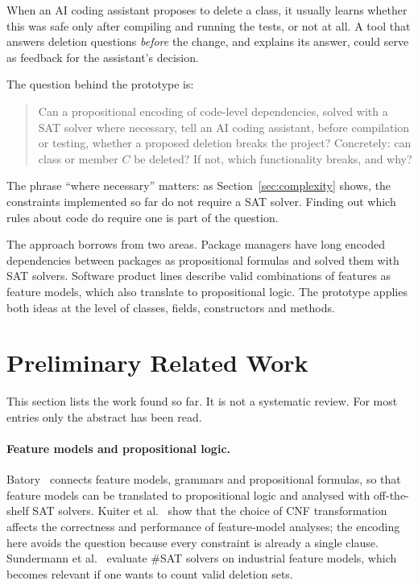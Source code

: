 \documentclass[11pt,a4paper]{article}
\begin{document}
When an AI coding assistant proposes to delete a class, it usually learns
whether this was safe only after compiling and running the tests, or not
at all. A tool that answers deletion questions \emph{before} the change,
and explains its answer, could serve as feedback for the assistant's
decision.

The question behind the prototype is:

\begin{quote}
Can a propositional encoding of code-level dependencies, solved with a
SAT solver where necessary, tell an AI coding assistant, before
compilation or testing, whether a proposed deletion breaks the project?
Concretely: can class or member $C$ be deleted? If not, which
functionality breaks, and why?
\end{quote}

The phrase ``where necessary'' matters: as Section~\ref{sec:complexity}
shows, the constraints implemented so far do not require a SAT solver.
Finding out which rules about code do require one is part of the
question.

The approach borrows from two areas. Package managers have long encoded
dependencies between packages as propositional formulas and solved them
with SAT solvers. Software product lines describe valid combinations of
features as feature models, which also translate to propositional logic.
The prototype applies both ideas at the level of classes, fields,
constructors and methods.

\section{Preliminary Related Work}\label{sec:related}

This section lists the work found so far. It is not a systematic review.
For most entries only the abstract has been read.

\paragraph{Feature models and propositional logic.}
Batory~\cite{batory2005} connects feature models, grammars and
propositional formulas, so that feature models can be translated to
propositional logic and analysed with off-the-shelf SAT solvers. Kuiter et
al.~\cite{kuiter2022} show that the choice of CNF transformation affects
the correctness and performance of feature-model analyses; the encoding
here avoids the question because every constraint is already a single
clause. Sundermann et al.~\cite{sundermann2023} evaluate \#SAT solvers on
industrial feature models, which becomes relevant if one wants to count
valid deletion sets.
\end{document}
